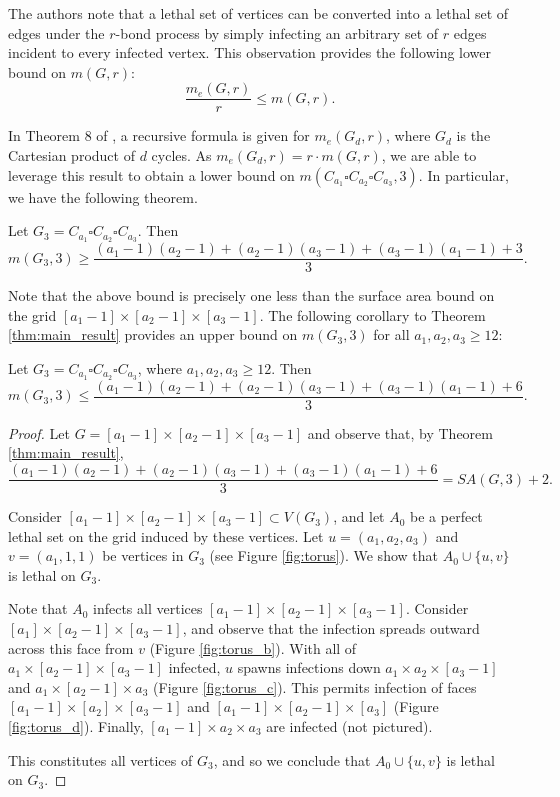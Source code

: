 The authors note that a lethal set of vertices can be converted into a lethal set of edges under the $r$-bond process by simply infecting an arbitrary set of $r$ edges incident to every infected vertex. This observation provides the following lower bound on $m(G,r)$:
$$\frac{m_e(G,r)}{r} \leq m(G,r).$$

In Theorem 8 of \cite{hambardzumyan:2020}, a recursive formula is given for $m_e(G_d,r)$, where $G_d$ is the Cartesian product of $d$ cycles. As $m_e(G_d,r) = r \cdot m(G,r)$, we are able to leverage this result to obtain a lower bound on $m(C_{a_1} \square C_{a_2} \square C_{a_3}, 3)$. In particular, we have the following theorem.

\begin{thm}
\label{thm:3d_torus_lb}
Let $G_3 = C_{a_1} \square C_{a_2} \square C_{a_3}$. Then
$$m(G_3,3) \geq \frac{(a_1-1)(a_2-1) + (a_2-1)(a_3-1) + (a_3-1)(a_1 -1) + 3}{3}.$$
\end{thm}

\noindent Note that the above bound is precisely one less than the surface area bound on the grid $[a_1-1] \times [a_2-1] \times [a_3-1]$. The following corollary to Theorem \ref{thm:main_result} provides an upper bound on $m(G_3,3)$ for all $a_1,a_2,a_3 \geq 12$:

\begin{cor}
Let $G_3 = C_{a_1} \square C_{a_2} \square C_{a_3}$, where $a_1,a_2,a_3 \geq 12$. Then
$$m(G_3,3) \leq \frac{(a_1-1)(a_2-1) + (a_2-1)(a_3-1) + (a_3-1)(a_1 -1) + 6}{3}.$$
\end{cor}

\begin{proof}
Let $G = [a_1-1] \times [a_2-1] \times [a_3-1]$ and observe that, by Theorem \ref{thm:main_result},
$$\frac{(a_1-1)(a_2-1) + (a_2-1)(a_3-1) + (a_3-1)(a_1 -1) + 6}{3} = SA(G,3) + 2.$$

Consider $[a_1-1] \times [a_2-1] \times [a_3-1] \subset V(G_3)$, and let $A_0$ be a perfect lethal set on the grid induced by these vertices. Let $u = (a_1,a_2,a_3)$ and $v = (a_1,1,1)$ be vertices in $G_3$ (see Figure \ref{fig:torus}). We show that $A_0 \cup \{u,v\}$ is lethal on $G_3$. 

Note that $A_0$ infects all vertices $[a_1-1] \times [a_2-1] \times [a_3-1]$. Consider $[a_1] \times [a_2-1] \times [a_3-1]$, and observe that the infection spreads outward across this face from $v$ (Figure \ref{fig:torus_b}). With all of $a_1 \times [a_2-1] \times [a_3-1]$ infected, $u$ spawns infections down $a_1 \times a_2 \times [a_3-1]$ and $a_1 \times [a_2-1] \times a_3$ (Figure \ref{fig:torus_c}). This permits infection of faces $[a_1-1] \times [a_2] \times [a_3-1]$ and $[a_1-1] \times [a_2-1] \times [a_3]$ (Figure \ref{fig:torus_d}). Finally, $[a_1-1] \times a_2 \times a_3$ are infected (not pictured).

This constitutes all vertices of $G_3$, and so we conclude that $A_0 \cup \{u,v\}$ is lethal on $G_3$. 
\end{proof}

